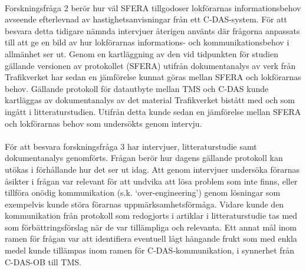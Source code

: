\paragraph{}
\hspace{-11pt}Forskningsfråga 2 berör hur väl SFERA tillgodoser lokförarnas informationsbehov avseende efterlevnad av hastighetsanvisningar från ett C-DAS-system.
För att besvara detta tidigare nämnda intervjuer återigen använts där frågorna anpassats till att ge en bild av hur lokförarnas informations- och kommunikationsbehov i allmänhet ser ut.
Genom en kartläggning av den vid tidpunkten för studien gällande versionen av protokollet (SFERA) utifrån dokumentanalys av verk från Trafikverket har sedan en jämförelse kunnat göras mellan SFERA och lokförarnas behov.
Gällande protokoll för datautbyte mellan TMS och C-DAS kunde kartläggas av dokumentanalys av det material Trafikverket bistått med och som ingått i litteraturstudien.
Utifrån detta kunde sedan en jämförelse mellan SFERA och lokförarnas behov som undersökts genom intervju.
\paragraph{}
\hspace{-11pt}För att besvara forskningsfråga 3 har intervjuer, litteraturstudie samt dokumentanalys genomförts.
Frågan berör hur dagens gällande protokoll kan utökas i förhållande hur det ser ut idag.
Att genom intervjuer undersöka förarnas åsikter i frågan var relevant för att undvika att lösa problem som inte finns, eller tillföra onödig kommunikation (s.k. \lq{}over-engineering\rq{}) genom lösningar som exempelvis kunde störa förarnas uppmärksamhetsförmåga.
Vidare kunde den kommunikation från protokoll som redogjorts i artiklar i litteraturstudie tas med som förbättringsförslag när de var tillämpliga och relevanta.
Ett annat mål inom ramen för frågan var att identifiera eventuell lågt hängande frukt som med enkla medel kunde tillämpas inom ramen för C-DAS-kommunikation, i synnerhet från C-DAS-OB till TMS\@.

